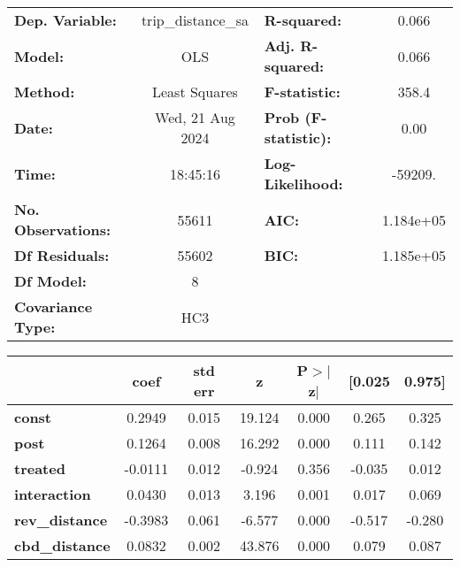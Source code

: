 \begin{center}
\begin{tabular}{lclc}
\toprule
\textbf{Dep. Variable:}    & trip\_distance\_sa & \textbf{  R-squared:         } &     0.066   \\
\textbf{Model:}            &        OLS         & \textbf{  Adj. R-squared:    } &     0.066   \\
\textbf{Method:}           &   Least Squares    & \textbf{  F-statistic:       } &     358.4   \\
\textbf{Date:}             &  Wed, 21 Aug 2024  & \textbf{  Prob (F-statistic):} &     0.00    \\
\textbf{Time:}             &      18:45:16      & \textbf{  Log-Likelihood:    } &   -59209.   \\
\textbf{No. Observations:} &        55611       & \textbf{  AIC:               } & 1.184e+05   \\
\textbf{Df Residuals:}     &        55602       & \textbf{  BIC:               } & 1.185e+05   \\
\textbf{Df Model:}         &            8       & \textbf{                     } &             \\
\textbf{Covariance Type:}  &        HC3         & \textbf{                     } &             \\
\bottomrule
\end{tabular}
\begin{tabular}{lcccccc}
                       & \textbf{coef} & \textbf{std err} & \textbf{z} & \textbf{P$> |$z$|$} & \textbf{[0.025} & \textbf{0.975]}  \\
\midrule
\textbf{const}         &       0.2949  &        0.015     &    19.124  &         0.000        &        0.265    &        0.325     \\
\textbf{post}          &       0.1264  &        0.008     &    16.292  &         0.000        &        0.111    &        0.142     \\
\textbf{treated}       &      -0.0111  &        0.012     &    -0.924  &         0.356        &       -0.035    &        0.012     \\
\textbf{interaction}   &       0.0430  &        0.013     &     3.196  &         0.001        &        0.017    &        0.069     \\
\textbf{rev\_distance} &      -0.3983  &        0.061     &    -6.577  &         0.000        &       -0.517    &       -0.280     \\
\textbf{cbd\_distance} &       0.0832  &        0.002     &    43.876  &         0.000        &        0.079    &        0.087     \\

\end{tabular}
\end{center}
